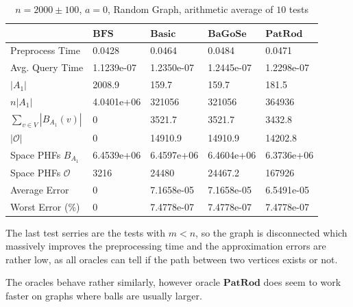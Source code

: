 \documentclass[shortabstract, lic, english]{iithesis}
\theoremstyle{definition} \newtheorem{definition}{Definition}[chapter]
\theoremstyle{plain} \newtheorem{remark}[definition]{Observation}
\theoremstyle{plain} \newtheorem{theorem}[definition]{Theorem}
\theoremstyle{plain} \newtheorem{lemma}[definition]{Lemma}
\theoremstyle{plain} \newtheorem{conjecture}[definition]{Conjecture}
\begin{document}
\begin{table}[H] \label{test:random.a0}
    \centering
    \begin{tabular}{ |p{3cm}||p{2cm}|p{2cm}|p{2cm}|p{2cm}|  } 
        \hline
        & $\mathbf{BFS}$ & $\mathbf{Basic}$ & $\mathbf{BaGoSe}$ & $\mathbf{PatRod}$ \\
        \hline
        \hline
        Preprocess Time                 & 0.0428     & 0.0464     & 0.0484      & 0.0471     \\
        \hline
        Avg. Query Time                 & 1.1239e-07 & 1.2350e-07 & 1.2445e-07  & 1.2298e-07 \\
        \hline
        $|A_1|$                         & 2008.9     & 159.7      & 159.7       & 181.5      \\
        \hline
        $n |A_1|$                       & 4.0401e+06 & 321056     & 321056      & 364936     \\
        \hline
        $\sum_{v \in V} |B_{A_1}(v)| $  & 0          & 3521.7     & 3521.7      & 3432.8     \\
        \hline
        $|\mathcal{O}|$                 & 0          & 14910.9    & 14910.9     & 14202.8    \\
        \hline
        Space PHFs $B_{A_1}$            & 6.4539e+06 & 6.4597e+06 & 6.4604e+06  & 6.3736e+06 \\
        \hline
        Space PHFs $\mathcal{O}$        & 3216       & 24480      & 24467.2     & 167926     \\
        \hline
        Average Error                   & 0          & 7.1658e-05 & 7.1658e-05  & 6.5491e-05 \\
        \hline
        Worst Error (\%)                & 0          & 7.4778e-07 & 7.4778e-07  & 7.4778e-07 \\
        \hline

    \end{tabular}
    \caption{$n = 2000 \pm 100$, $a = 0$, Random Graph, arithmetic average of $10$ tests}
\end{table}

The last test serries are the tests with $m < n$, so the graph is disconnected which massively improves the preprocessing time and the approximation errors are rather low,
as all oracles can tell if the path between two vertices exists or not.


The oracles behave rather similarly, however oracle $\mathbf{PatRod}$ does seem to work faster on graphs where balls are usually larger.
\end{document}
